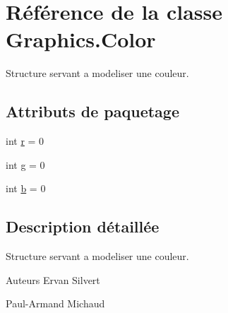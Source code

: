 \hypertarget{classGraphics_1_1Color}{\section{Référence de la classe Graphics.\-Color}
\label{classGraphics_1_1Color}
}


Structure servant a modeliser une couleur.  


\subsection*{Attributs de paquetage}
\begin{DoxyCompactItemize}
\item 
int \hyperlink{classGraphics_1_1Color_a6e040c14375b2701c82e72a3f2fbc7ec}{r} = 0
\item 
int \hyperlink{classGraphics_1_1Color_a69ddf3728f1981950e28a5172bf48fed}{g} = 0
\item 
int \hyperlink{classGraphics_1_1Color_a2b25de212325802068d3f888c569f09f}{b} = 0
\end{DoxyCompactItemize}


\subsection{Description détaillée}
Structure servant a modeliser une couleur. 

\begin{DoxyAuthor}{Auteurs}
Ervan Silvert 

Paul-\/\-Armand Michaud 
\end{DoxyAuthor}


